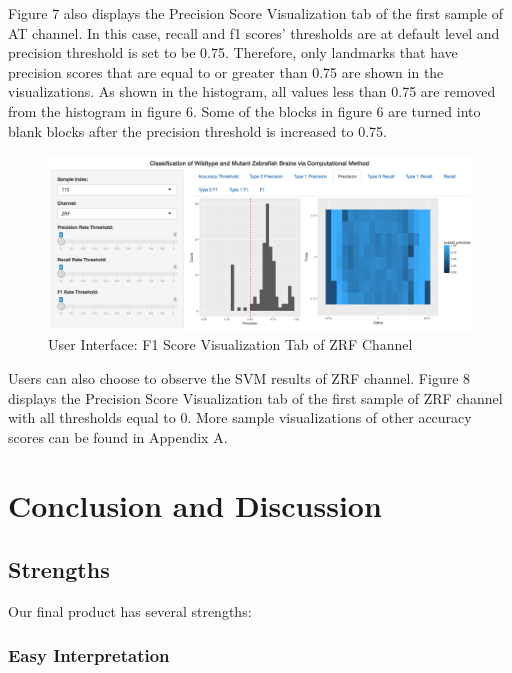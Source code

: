 \documentclass[10pt,letterpaper]{article}
\begin{document}
Figure 7 also displays the Precision Score Visualization tab of the
first sample of AT channel. In this case, recall and f1 scores'
thresholds are at default level and precision threshold is set to be
0.75. Therefore, only landmarks that have precision scores that are
equal to or greater than 0.75 are shown in the visualizations. As shown
in the histogram, all values less than 0.75 are removed from the
histogram in figure 6. Some of the blocks in figure 6 are turned into
blank blocks after the precision threshold is increased to 0.75.

\begin{figure}[h]

{\centering \includegraphics[width=5.04in]{figures/shiny8} 

}

\caption{User Interface: F1 Score Visualization Tab of ZRF Channel}\label{fig:shiny8}
\end{figure}

Users can also choose to observe the SVM results of ZRF channel. Figure
8 displays the Precision Score Visualization tab of the first sample of
ZRF channel with all thresholds equal to 0. More sample visualizations
of other accuracy scores can be found in Appendix A.

\section{Conclusion and Discussion}\label{conclusion-and-discussion}

\subsection{Strengths}\label{strengths}

Our final product has several strengths:

\subsubsection{Easy Interpretation}\label{easy-interpretation}
\end{document}
